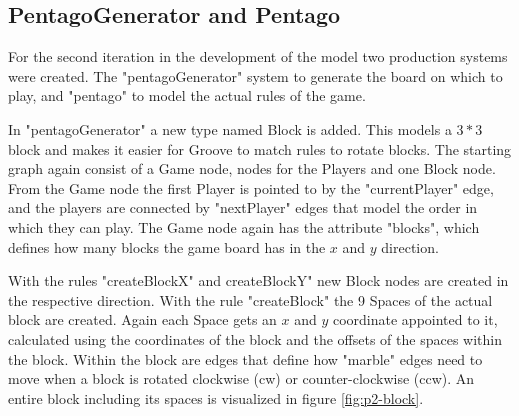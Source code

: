 \subsection{PentagoGenerator and Pentago}
\label{pentagoGenerator_and_pentago}

For the second iteration in the development of the model two production systems were created. The "pentagoGenerator" system to generate the board on which to play, and "pentago" to model the actual rules of the game.

\vspace{6pt}

In "pentagoGenerator" a new type named Block is added. This models a $3*3$ block and makes it easier for Groove to match rules to rotate blocks.
The starting graph again consist of a Game node, nodes for the Players and one Block node. From the Game node the first Player is pointed to by the "currentPlayer" edge, and the players are connected by "nextPlayer" edges that model the order in which they can play.
The Game node again has the attribute "blocks", which defines how many blocks the game board has in the $x$ and $y$ direction.

\vspace{6pt}

With the rules "createBlockX" and createBlockY" new Block nodes are created in the respective direction.
With the rule "createBlock" the 9 Spaces of the actual block are created. Again each Space gets an $x$ and $y$ coordinate appointed to it, calculated using the coordinates of the block and the offsets of the spaces within the block.
Within the block are edges that define how "marble" edges need to move when a block is rotated clockwise (cw) or counter-clockwise (ccw).
An entire block including its spaces is visualized in figure  \ref{fig:p2-block}.

